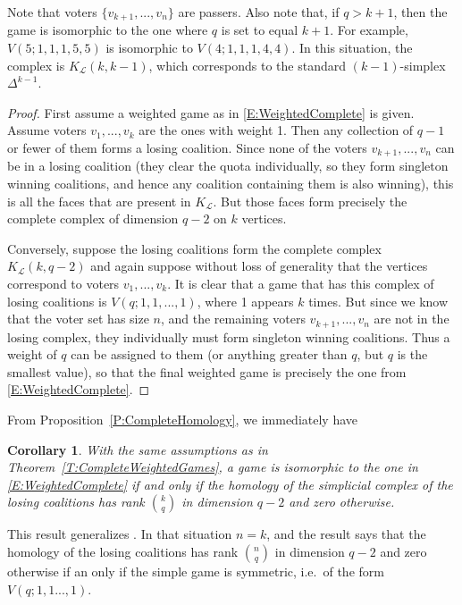 \documentclass[11pt]{amsart}
\theoremstyle{plain}
\newtheorem{cor}[thm]{Corollary}
\theoremstyle{definition}
\theoremstyle{remark}
\newcommand{\refT}[1]{Theorem~\ref{T:#1}}
\newcommand{\refP}[1]{Proposition~\ref{P:#1}}
\begin{document}
Note that voters $\{v_{k+1}, ..., v_n\}$ are passers. Also note that, if $q>k+1$, then the game is isomorphic to the one where $q$ is set to equal $k+1$. For example, $V(5;1,1,1,5,5)$ is isomorphic to $V(4;1,1,1,4,4)$. In this situation, the complex is $K_{\mathcal L}(k,k-1)$, which corresponds to the standard $(k-1)$-simplex $\Delta^{k-1}$.

\begin{proof}
First assume a weighted game as in \eqref{E:WeightedComplete} is given. Assume voters $v_1, ..., v_k$ are the ones with weight 1. Then any collection of $q-1$ or fewer of them forms a losing coalition. Since none of the voters $v_{k+1}, ..., v_n$ can be in a losing coalition (they clear the quota individually, so they form singleton winning coalitions, and hence any coalition containing them is also winning), this is all the faces that are present in $K_{\mathcal L}$. But those faces form precisely the complete complex of dimension $q-2$ on $k$ vertices.

Conversely, suppose the losing coalitions form the complete complex $K_{\mathcal L}(k,q-2)$ and again suppose without loss of generality that the vertices correspond to voters $v_1, ..., v_k$. It is clear that a game that has this complex of losing coalitions is $V(q;1,1,...,1)$, where 1 appears $k$ times. But since we know that the voter set has size $n$, and the remaining voters $v_{k+1}, ..., v_n$ are not in the losing complex, they individually must form singleton winning coalitions. Thus a weight of $q$ can be assigned to them (or anything greater than $q$, but $q$ is the smallest value), so that the final weighted game is precisely the one from \eqref{E:WeightedComplete}.
\end{proof}

From \refP{CompleteHomology}, we immediately have

\begin{cor}\label{C:CompleteHomologyWeighted}
With the same assumptions as in \refT{CompleteWeightedGames}, a game is isomorphic to the one in \eqref{E:WeightedComplete} if and only if the homology of the simplicial complex of the losing coalitions has rank ${k \choose q}$ in dimension $q-2$ and zero otherwise.
\end{cor}

This result generalizes \cite[Theorem 4.5]{VV:SimpleGames}. In that situation $n=k$, and the result says that the homology of the losing coalitions has rank ${n \choose q}$ in dimension $q-2$ and zero otherwise if an only if the simple game is symmetric, i.e.~of the form $V(q;1,1...,1)$.
\end{document}
